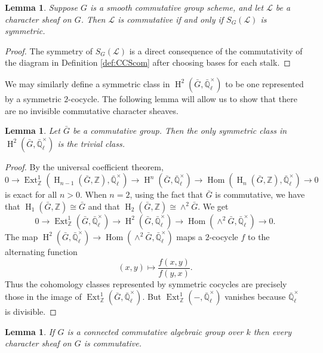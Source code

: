 \documentclass[10pt]{amsart}
\theoremstyle{plain}
\newtheorem{lemma}[theorem]{Lemma}
\theoremstyle{definition}
\newcommand{\ZZ}{{\mathbb{Z}}}
\newcommand{\EE}{\mathbb{\bar Q}_\ell}
\newcommand{\Fq}{k}
\newcommand{\EEx}{\EE^\times}
\DeclareMathOperator{\Hom}{Hom}
\DeclareMathOperator{\Ext}{Ext}
\DeclareMathOperator{\Hh}{H}
\newcommand{\cs}[1]{{\mathcal{#1}}}
\newcommand{\bG}{\bar{G}}
\begin{document}
\begin{lemma} \label{lem:symccslink}
Suppose $G$ is a smooth commutative group scheme, and let $\cs{L}$ be a character sheaf on $G$.
Then $\cs{L}$ is commutative if and only if $S_G(\cs{L})$ is symmetric.
\end{lemma}
\begin{proof}
The symmetry of $S_G(\cs{L})$ is a direct consequence of the commutativity of the diagram in Definition \ref{def:CCScom}
after choosing bases for each stalk.
\end{proof}

We may similarly define a symmetric class in $\Hh^2(\bG, \EEx)$ to be one represented by a symmetric $2$-cocycle.
The following lemma will allow us to show that there are no invisible commutative character sheaves.

\begin{lemma} \label{lem:symtriv}
Let $\bG$ be a commutative group.  Then the only symmetric class in $\Hh^2(\bG, \EEx)$ is the trivial class.
\end{lemma}

\begin{proof}
By the universal coefficient theorem,
\[
0 \to \Ext^1_\ZZ(\Hh_{n-1}(\bG, \ZZ), \EEx) \to \Hh^n(\bG, \EEx) \to \Hom(\Hh_n(\bG, \ZZ), \EEx) \to 0
\]
is exact for all $n > 0$.  When $n = 2$, using the fact that $\bG$ is commutative, we have that $\Hh_1(\bG, \ZZ) \cong \bG$
and that $\Hh_2(\bG, \ZZ) \cong \wedge^2 \bG$. We get
\[
0 \to \Ext^1_\ZZ(\bG, \EEx) \to \Hh^2(\bG, \EEx) \to \Hom(\wedge^2 \bG, \EEx) \to 0.
\]
The map $\Hh^2(\bG, \EEx) \to \Hom(\wedge^2 \bG, \EEx)$ maps a $2$-cocycle $f$ to the alternating function
\[
(x,y) \mapsto \frac{f(x,y)}{f(y,x)}.
\]
Thus the cohomology classes represented by symmetric cocycles are precisely those in the image of $\Ext^1_\ZZ(\bG, \EEx)$.
But $\Ext^1_\ZZ(-, \EEx)$ vanishes because $\EEx$ is divisible.
\end{proof}

\begin{lemma} \label{lem:conncomm}
If $G$ is a connected commutative algebraic group over $\Fq$ then every character sheaf on $G$ is commutative.
\end{lemma}
\end{document}

